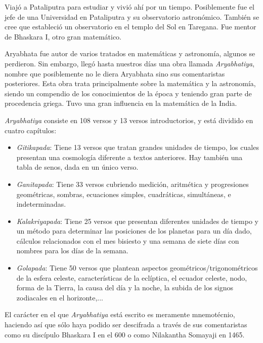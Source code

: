 \documentclass[a4paper, 11pt]{article}
\begin{document}
		Viajó a Pataliputra para estudiar y vivió ahí por un tiempo. Posiblemente fue el jefe de una Universidad en
		Pataliputra y su observatorio astronómico. También se cree que estableció un observatorio en el templo del Sol
		en Taregana. Fue mentor de Bhaskara I, otro gran matemático.
				
		Aryabhata fue autor de varios tratados en matemáticas y astronomía, algunos se perdieron. Sin embargo, llegó
		hasta nuestros días una obra llamada \textit{Aryabhatiya}, nombre que posiblemente no le diera Aryabhata sino
		sus comentaristas posteriores. Esta obra trata principalmente sobre la matemática y la astronomía, siendo un
		compendio de los conocimientos de la época y teniendo gran parte de procedencia griega. Tuvo una gran influencia
		en la matemática de la India.

		\textit{Aryabhatiya} consiste en 108 versos y 13 versos introductorios, y está dividido en cuatro capítulos:
		\begin{itemize}
			\item \textit{Gitikapada}: Tiene 13 versos que tratan grandes unidades de tiempo, los cuales presentan una
			cosmología diferente a textos anteriores. Hay también una tabla de senos, dada en un único verso.
			\item \textit{Ganitapada}: Tiene 33 versos cubriendo medición, aritmética y progresiones geométricas, sombras,
			ecuaciones simples, cuadráticas, simultáneas, e indeterminadas.
			\item \textit{Kalakriyapada}: Tiene 25 versos que presentan diferentes unidades de tiempo y un método para
			determinar las posiciones de los planetas para un día dado, cálculos relacionados con el mes bisiesto y una
			semana de siete días con nombres para los días de la semana.
			\item \textit{Golapada}: Tiene 50 versos que plantean aspectos geométricos/trigonométricos de la esfera
			celeste, características de la eclíptica, el ecuador celeste, nodo, forma de la Tierra, la causa del día
			y la noche, la subida de los signos zodiacales en el horizonte,...
		\end{itemize}
		
		El carácter en el que \textit{Aryabhatiya} está escrito es meramente mnemotécnio, haciendo así que sólo haya
		podido ser descifrada a través de sus comentaristas como su discípulo Bhaskara I en el 600 o como Nilakantha
		Somayaji en 1465.
		
\end{document}
